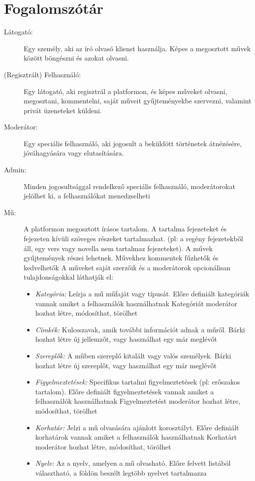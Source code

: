 \documentclass[12pt,a4paper,oneside]{article}
\begin{document}
\section{Fogalomszótár}
\begin{description}
\item [Látogató:] Egy személy, aki az író olvasó klienst használja. Képes a megosztott művek között böngészni és azokat olvasni.

\item [(Regisztrált) Felhasználó:] Egy látogató, aki regisztrál a platformon, és képes műveket olvasni, megosztani, kommentelni, saját műveit gyűjteményekbe szervezni, valamint privát üzeneteket küldeni.

\item [Moderátor:] Egy speciális felhasználó, aki jogosult a beküldött történetek átnézésére, jóváhagyására vagy elutasítására.

\item [Admin:] Minden jogosultsággal rendelkező speciális felhasználó, moderátorokat jelölhet ki, a felhasználókat menedzselheti

\item [Mű:] A platformon megosztott írásos tartalom. A tartalma fejezeteket és fejezeten kívüli szöveges részeket tartalmazhat. (pl: a regény fejezetekből áll, egy vers vagy novella nem tartalmaz fejezeteket).
A művek gyűjtemények részei lehetnek. Művekhez kommentek fűzhetők és kedvelhetők
A műveket saját szerzőik és a moderátorok opcionálisan tulajdonságokkal láthatják el:

\begin{itemize}
\item \emph{Kategória:} Leírja a mű műfaját vagy típusát.
Előre definiált kategóriák vannak amiket a felhasználók használhatnak
Kategóriát moderátor hozhat létre, módosíthat, törölhet
\item \emph{Címkék:} Kulcsszavak, amik további információt adnak a műről.
Bárki hozhat létre új jellemzőt, vagy használhat egy már meglévőt
\item \emph{Szereplők:} A műben szereplő kitalált vagy valós személyek.
Bárki hozhat létre új szereplőt, vagy használhat egy már meglévőt 
\item \emph{Figyelmeztetések:} Specifikus tartalmi figyelmeztetések (pl: erőszakos tartalom).
Előre definiált figyelmeztetések vannak amiket a felhasználók használhatnak
Figyelmeztetést moderátor hozhat létre, módosíthat, törölhet
\item \emph{Korhatár:} Jelzi a mű olvasására ajánlott korosztályt.
Előre definiált korhatárok vannak amiket a felhasználók használhatnak
Korhatárt moderátor hozhat létre, módosíthat, törölhet
\item \emph{Nyelv:} Az a nyelv, amelyen a mű olvasható.
Előre felvett listából választható, a földön beszélt legtöbb nyelvet tartalmazza
\end{itemize}


\end{description}
\end{document}
